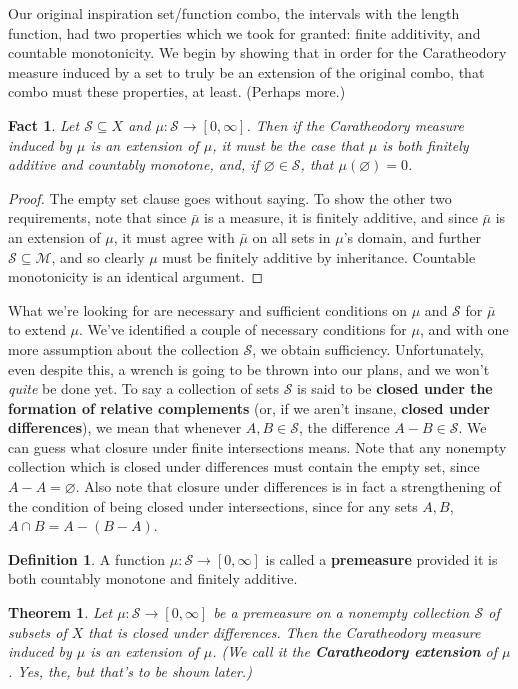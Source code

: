 \documentclass{article}
\theoremstyle{definition}
\newtheorem{definition}{Definition}[section]
\theoremstyle{plain}
\theoremstyle{theorem}
\newtheorem{fact}{Fact}[section]
\newtheorem{theorem}{Theorem}[section]
\begin{document}
Our original inspiration set/function combo, the intervals with the length function, had two properties which we took for granted: finite additivity, and countable monotonicity. We begin by showing that in order for the Caratheodory measure induced by a set to truly be an extension of the original combo, that combo must these properties, at least. (Perhaps more.)
\begin{fact}
	Let $\mathcal{S} \subseteq X$ and $\mu:\mathcal{S} \to [0,\infty]$. Then if the Caratheodory measure induced by $\mu$ is an extension of $\mu$, it must be the case that $\mu$ is both finitely additive and countably monotone, and, if $\varnothing \in \mathcal{S}$, that $\mu(\varnothing) = 0$.
\end{fact}
\begin{proof}
	The empty set clause goes without saying. To show the other two requirements, note that since $\bar{\mu}$ is a measure, it is finitely additive, and since $\bar{\mu}$ is an extension of $\mu$, it must agree with $\bar{\mu}$ on all sets in $\mu$'s domain, and further $\mathcal{S} \subseteq \mathcal{M}$, and so clearly $\mu$ must be finitely additive by inheritance. Countable monotonicity is an identical argument.
\end{proof}
What we're looking for are necessary and sufficient conditions on $\mu$ and $\mathcal{S}$ for $\bar{\mu}$ to extend $\mu$. We've identified a couple of necessary conditions for $\mu$, and with one more assumption about the collection $\mathcal{S}$, we obtain sufficiency. Unfortunately, even despite this, a wrench is going to be thrown into our plans, and we won't \textit{quite} be done yet. To say a collection of sets $\mathcal{S}$ is said to be \textbf{closed under the formation of relative complements} (or, if we aren't insane, \textbf{closed under differences}), we mean that whenever $A,B \in \mathcal{S}$, the difference $A-B \in \mathcal{S}$. We can guess what closure under finite intersections means. Note that any nonempty collection which is closed under differences must contain the empty set, since $A - A = \varnothing$. Also note that closure under differences is in fact a strengthening of the condition of being closed under intersections, since for any sets $A,B$, $A \cap B = A - (B - A)$.
\begin{definition}
	A function $\mu:\mathcal{S} \to [0,\infty]$ is called a \textbf{premeasure} provided it is both countably monotone and finitely additive.
\end{definition} 
\begin{theorem}
	Let $\mu:\mathcal{S} \to [0,\infty]$ be a premeasure on a nonempty collection $\mathcal{S}$ of subsets of $X$ that is closed under differences. Then the Caratheodory measure induced by $\mu$ is an extension of $\mu$. (We call it the \textbf{Caratheodory extension} of $\mu$. Yes, the, but that's to be shown later.)
\end{theorem}
\end{document}
